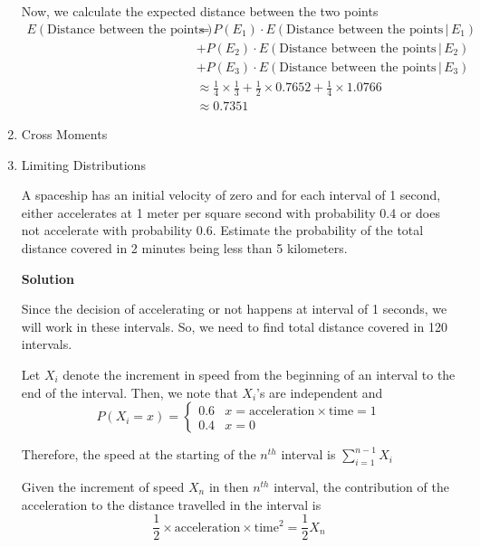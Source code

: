 \documentclass[12pt, oneside]{article}
\begin{document}
\begin{enumerate}
{    Now, we calculate the expected distance between the two points
    \begin{align*}
        E(\text{Distance between the points}) &= P(E_1) \cdot E(\text{Distance between the points} \,|\, E_1) \\
                                              &+ P(E_2) \cdot E(\text{Distance between the points} \,|\, E_2) \\
                                              &+ P(E_3) \cdot E(\text{Distance between the points} \,|\, E_3) \\
                                              &\approx \frac{1}{4} \times \frac{1}{3} + \frac{1}{2} \times 0.7652
                                                   + \frac{1}{4} \times 1.0766 \\
                                              &\approx 0.7351
    \end{align*}
}

\item Cross Moments

\item {
    Limiting Distributions

    A spaceship has an initial velocity of zero and for each interval of 1 second,
    either accelerates at 1 meter per square second with probability 0.4 or does not 
    accelerate with probability 0.6. Estimate the probability of the total distance covered
    in 2 minutes being less than 5 kilometers.

    \textbf{Solution}

    Since the decision of accelerating or not happens at interval of 1 seconds, we will
    work in these intervals. So, we need to find total distance covered in 120 intervals.

    Let \(X_i\) denote the increment in speed from the beginning of an interval to the
    end of the interval. Then, we note that \(X_i\)'s are independent and 
    \[
        P(X_i = x) = \begin{cases}
                        0.6 & x = \text{acceleration} \times \text{time} = 1 \\
                        0.4 & x = 0
                     \end{cases}
    \]

    Therefore, the speed at the starting of the \(n^{th}\) interval is 
    \(\sum_{i=1}^{n-1} X_i\)

    Given the increment of speed \(X_n\) in then \(n^{th}\) interval, the contribution of the
    acceleration to the distance travelled in the interval is
    \[\frac{1}{2} \times \text{acceleration} \times \text{time}^2 = \frac{1}{2} X_n\]

}
\end{enumerate}
\end{document}
